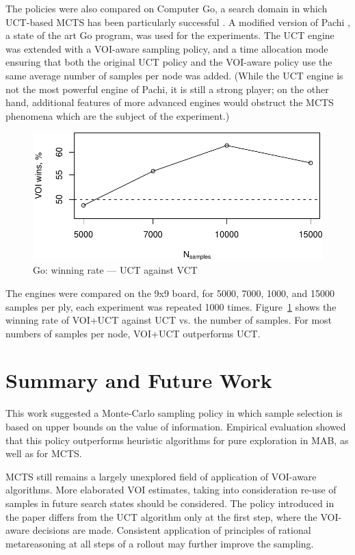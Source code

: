 \documentclass{ecai2012}
\begin{document}
The policies were also compared on Computer Go, a  search domain
in which UCT-based MCTS has been particularly successful
\cite{Gelly.mogo}. A modified version of Pachi \cite{Braudis.pachi}, a state of the art
Go program, was used for the experiments. The UCT engine was extended
with a VOI-aware sampling policy, and a time allocation mode ensuring
that both the original UCT policy and the VOI-aware policy use the
same average number of samples per node was added. (While the UCT
engine is not the most powerful engine of Pachi, it is still a strong
player; on the other hand, additional features of more advanced
engines would obstruct the MCTS phenomena which are the subject of
the experiment.)
\begin{figure}[h!]
\centering
\includegraphics[scale=0.5]{vct-wins.pdf}
\vspace{-8pt}
\caption{Go: winning rate --- UCT against VCT}
\label{fig:vct-against-uct}
\vspace{-16pt}
\end{figure}
The engines were compared on the 9x9 board, for 5000, 7000, 1000, and
15000 samples per ply, each experiment was repeated
1000 times. Figure~\ref{fig:vct-against-uct}
shows the winning rate of VOI+UCT against UCT vs. the number of
samples. For most numbers of samples per node, VOI+UCT outperforms UCT.

\section{Summary and Future Work}

This work suggested a Monte-Carlo sampling policy in which sample
selection is based on upper bounds on the value of
information. Empirical evaluation showed that this policy outperforms
heuristic algorithms for pure exploration in MAB, as well as for MCTS.

MCTS still remains a largely unexplored field of
application of VOI-aware algorithms. More elaborated VOI estimates,
taking into consideration re-use of samples in future search states
should be considered. The policy introduced in the paper differs from
the UCT algorithm only at the first step, where the VOI-aware
decisions are made. Consistent application of principles of rational
metareasoning at all steps of a rollout may further improve the
sampling.



\end{document}
